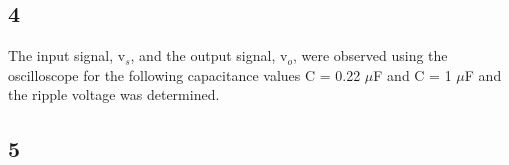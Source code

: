 \subsection*{4}
    
    The input signal, v$_s$, and the output signal, v$_o$, were observed using the oscilloscope for the following capacitance values C = 0.22 $\mu$F and C = 1 $\mu$F and the ripple voltage was determined.\

\subsection*{5}



